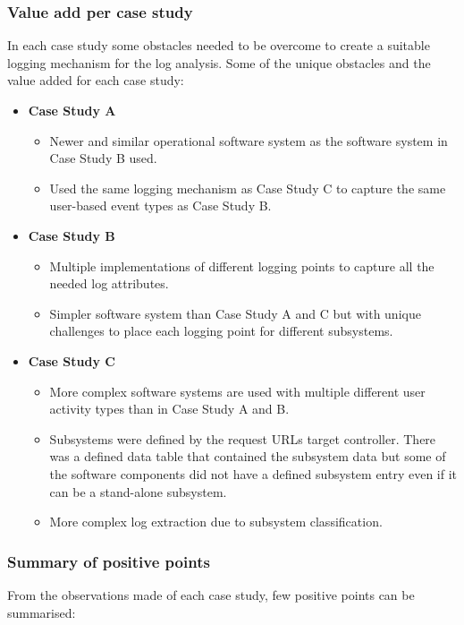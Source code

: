 \subsubsection{Value add per case study}
In each case study some obstacles needed to be overcome to create a suitable logging mechanism for the log analysis. Some of the unique obstacles and the value added for each case study:

\begin{itemize}
	\item \textbf{Case Study A}
		\begin{itemize}
			\item Newer and similar operational software system as the software system in Case Study B used.
			\item Used the same logging mechanism as Case Study C to capture the same user-based event types as Case Study B.
		\end{itemize}
	\item \textbf{Case Study B}
	\begin{itemize}
		\item Multiple implementations of different logging points to capture all the needed log attributes.
		\item Simpler software system than Case Study A and C but with unique challenges to place each logging point for different subsystems.
	\end{itemize}
	\item \textbf{Case Study C}
	\begin{itemize}
		\item More complex software systems are used with multiple different user activity types than in Case Study A and B.
		\item Subsystems were defined by the request URLs target controller. There was a defined data table that contained the subsystem data but some of the software components did not have a defined subsystem entry even if it can be a stand-alone subsystem.
		\item More complex log extraction due to subsystem classification.
	\end{itemize}
\end{itemize}

\subsubsection{Summary of positive points}
From the observations made of each case study, few positive points can be summarised:

